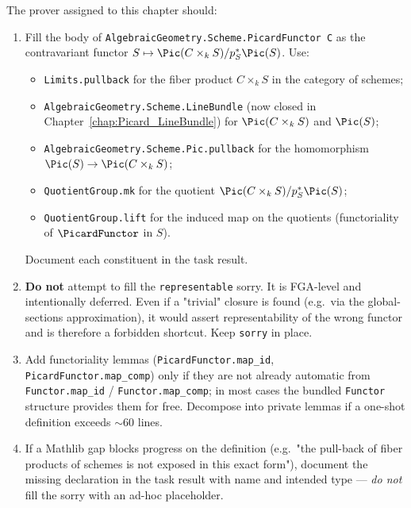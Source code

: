 The prover assigned to this chapter should:
\begin{enumerate}
  \item Fill the body of \lstinline{AlgebraicGeometry.Scheme.PicardFunctor C} as the contravariant functor $S \mapsto \Pic(C \times_k S) / p_S^*\Pic(S)$. Use:
    \begin{itemize}
      \item \lstinline{Limits.pullback} for the fiber product $C \times_k S$ in the category of schemes;
      \item \lstinline{AlgebraicGeometry.Scheme.LineBundle} (now closed in Chapter~\ref{chap:Picard_LineBundle}) for $\Pic(C \times_k S)$ and $\Pic(S)$;
      \item \lstinline{AlgebraicGeometry.Scheme.Pic.pullback} for the homomorphism $\Pic(S) \to \Pic(C \times_k S)$;
      \item \lstinline{QuotientGroup.mk} for the quotient $\Pic(C \times_k S) / p_S^*\Pic(S)$;
      \item \lstinline{QuotientGroup.lift} for the induced map on the quotients (functoriality of $\PicardFunctor$ in $S$).
    \end{itemize}
    Document each constituent in the task result.
  \item \textbf{Do not} attempt to fill the \lstinline{representable} sorry. It is FGA-level and intentionally deferred. Even if a "trivial" closure is found (e.g.\ via the global-sections approximation), it would assert representability of the wrong functor and is therefore a forbidden shortcut. Keep \lstinline{sorry} in place.
  \item Add functoriality lemmas (\lstinline{PicardFunctor.map_id}, \lstinline{PicardFunctor.map_comp}) only if they are not already automatic from \lstinline{Functor.map_id} / \lstinline{Functor.map_comp}; in most cases the bundled \lstinline{Functor} structure provides them for free. Decompose into private lemmas if a one-shot definition exceeds $\sim 60$ lines.
  \item If a Mathlib gap blocks progress on the definition (e.g.\ "the pull-back of fiber products of schemes is not exposed in this exact form"), document the missing declaration in the task result with name and intended type — \emph{do not} fill the sorry with an ad-hoc placeholder.
\end{enumerate}
